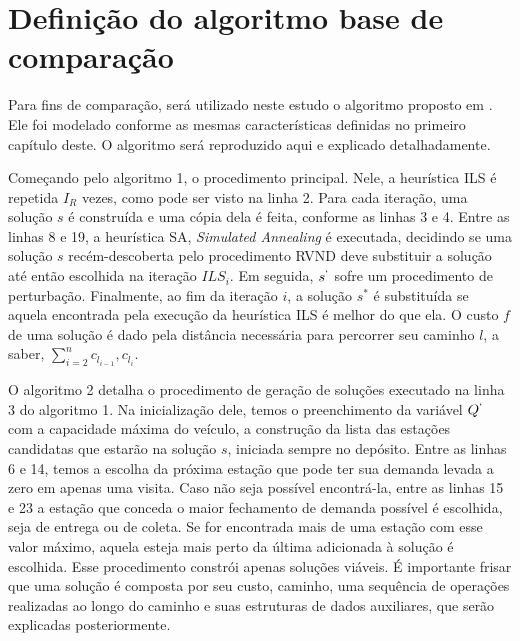 \chapter{Definição do algoritmo base de comparação}\label{chp:LABEL_CHP_3}

\par Para fins de comparação, será utilizado neste estudo o algoritmo proposto em \citep{art:REF_ART_1}. Ele foi modelado conforme as mesmas características definidas no primeiro capítulo deste. O algoritmo será reproduzido aqui e explicado detalhadamente.
\par Começando pelo algoritmo 1, o procedimento principal. Nele, a heurística ILS é repetida $I_R$ vezes, como pode ser visto na linha 2. Para cada iteração, uma solução $s$ é construída e uma cópia dela é feita, conforme as linhas 3 e 4. Entre as linhas 8 e 19, a heurística SA, \textit{Simulated Annealing} é executada, decidindo se uma solução $s$ recém-descoberta pelo procedimento RVND deve substituir a solução até então escolhida na iteração $ILS_i$. Em seguida, $s^\lq$ sofre um procedimento de perturbação. Finalmente, ao fim da iteração $i$, a solução $s^*$ é substituída se aquela encontrada pela execução da heurística ILS é melhor do que ela. O custo $f$ de uma solução é dado pela distância necessária para percorrer seu caminho $l$, a saber, $\sum_{i=2}^{n}c_{l_{i-1}},c_{l_i}$.
\par O algoritmo 2 detalha o procedimento de geração de soluções executado na linha 3 do algoritmo 1. Na inicialização dele, temos o preenchimento da variável $Q^\lq$ com a capacidade máxima do veículo, a construção da lista das estações candidatas que estarão na solução $s$, iniciada sempre no depósito. Entre as linhas 6 e 14, temos a escolha da próxima estação que pode ter sua demanda levada a zero em apenas uma visita. Caso não seja possível encontrá-la, entre as linhas 15 e 23 a estação que conceda o maior fechamento de demanda possível é escolhida, seja de entrega ou de coleta. Se for encontrada mais de uma estação com esse valor máximo, aquela esteja mais perto da última adicionada à solução é escolhida. Esse procedimento constrói apenas soluções viáveis. É importante frisar que uma solução é composta por seu custo, caminho, uma sequência de operações realizadas ao longo do caminho e suas estruturas de dados auxiliares, que serão explicadas posteriormente.
